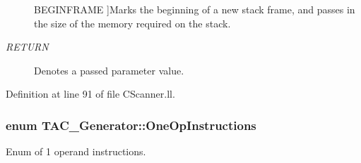 \begin{Desc}
\begin{description}
{\hypertarget{classTAC__Generator_ab58b7044cb5d16a454f4e01514175123a2900d0c97873b8e4282491148b366771}{B\-E\-G\-I\-N\-F\-R\-A\-M\-E}\label{classTAC__Generator_ab58b7044cb5d16a454f4e01514175123a2900d0c97873b8e4282491148b366771}
}]Marks the beginning of a new stack frame, and passes in the size of the memory required on the stack. \item[{\em 
\hypertarget{classTAC__Generator_ab58b7044cb5d16a454f4e01514175123a0e868fa94bac0750a62dfa98d0f56510}{R\-E\-T\-U\-R\-N}\label{classTAC__Generator_ab58b7044cb5d16a454f4e01514175123a0e868fa94bac0750a62dfa98d0f56510}
}]Denotes a passed parameter value. \end{description}
\end{Desc}


Definition at line 91 of file C\-Scanner.\-ll.

\hypertarget{classTAC__Generator_ab58b7044cb5d16a454f4e01514175123}{
\subsubsection[{One\-Op\-Instructions}]{\setlength{\rightskip}{0pt plus 5cm}enum {\bf T\-A\-C\-\_\-\-Generator\-::\-One\-Op\-Instructions}}}\label{classTAC__Generator_ab58b7044cb5d16a454f4e01514175123}


Enum of 1 operand instructions. 

